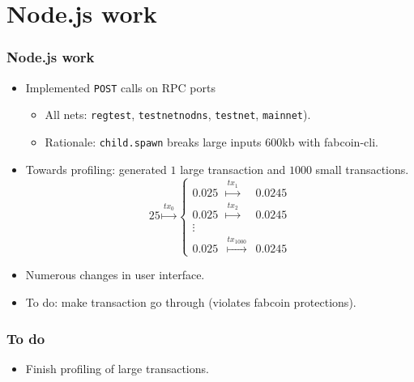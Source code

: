 \section{Node.js work}
\begin{frame}[fragile]
\frametitle{Node.js work}
\begin{itemize}
\item Implemented \verb|POST| calls on RPC ports
\begin{itemize}
\item All nets: \verb|regtest|, \verb|testnetnodns|, \verb|testnet|, \verb|mainnet|). 
\item Rationale: \verb|child.spawn| breaks large inputs $600$kb with fabcoin-cli.
\end{itemize}
\item Towards profiling: generated $1$ large transaction and $1000$ small transactions.
\[
25 \stackrel{tx_0}{\mapsto} \left\{\begin{array}{lll}
0.025 & \stackrel{tx_1}{\mapsto}& 0.0245 \\
0.025 & \stackrel{tx_2}{\mapsto}& 0.0245\\
\vdots\\
0.025 & \stackrel{tx_{1000}}{\mapsto}& 0.0245
\end{array} \right.
\]
\item Numerous changes in user interface.
\item To do: make transaction go through (violates fabcoin protections).
\end{itemize}

\end{frame}

\begin{frame}
\frametitle{To do}
\begin{itemize}
\item Finish profiling of large transactions.
\end{itemize}
\end{frame}